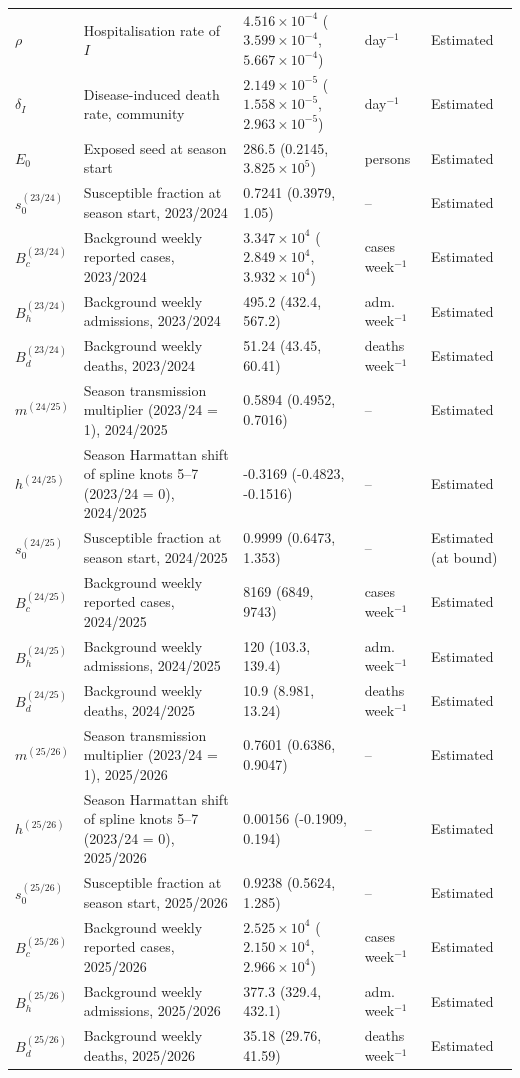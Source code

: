 \begin{longtable}{llll l}
$\rho$ & Hospitalisation rate of $I$ & $4.516\times10^{-4}$ ($3.599\times10^{-4}$, $5.667\times10^{-4}$) & day$^{-1}$ & Estimated\\
$\delta_I$ & Disease-induced death rate, community & $2.149\times10^{-5}$ ($1.558\times10^{-5}$, $2.963\times10^{-5}$) & day$^{-1}$ & Estimated\\
$E_0$ & Exposed seed at season start & 286.5 (0.2145, $3.825\times10^{5}$) & persons & Estimated\\
$s_0^{(23/24)}$ & Susceptible fraction at season start, 2023/2024 & 0.7241 (0.3979, 1.05) & -- & Estimated\\
$B_c^{(23/24)}$ & Background weekly reported cases, 2023/2024 & $3.347\times10^{4}$ ($2.849\times10^{4}$, $3.932\times10^{4}$) & cases week$^{-1}$ & Estimated\\
$B_h^{(23/24)}$ & Background weekly admissions, 2023/2024 & 495.2 (432.4, 567.2) & adm. week$^{-1}$ & Estimated\\
$B_d^{(23/24)}$ & Background weekly deaths, 2023/2024 & 51.24 (43.45, 60.41) & deaths week$^{-1}$ & Estimated\\
$m^{(24/25)}$ & Season transmission multiplier (2023/24 = 1), 2024/2025 & 0.5894 (0.4952, 0.7016) & -- & Estimated\\
$h^{(24/25)}$ & Season Harmattan shift of spline knots 5--7 (2023/24 = 0), 2024/2025 & -0.3169 (-0.4823, -0.1516) & -- & Estimated\\
$s_0^{(24/25)}$ & Susceptible fraction at season start, 2024/2025 & 0.9999 (0.6473, 1.353) & -- & Estimated (at bound)\\
$B_c^{(24/25)}$ & Background weekly reported cases, 2024/2025 & 8169 (6849, 9743) & cases week$^{-1}$ & Estimated\\
$B_h^{(24/25)}$ & Background weekly admissions, 2024/2025 & 120 (103.3, 139.4) & adm. week$^{-1}$ & Estimated\\
$B_d^{(24/25)}$ & Background weekly deaths, 2024/2025 & 10.9 (8.981, 13.24) & deaths week$^{-1}$ & Estimated\\
$m^{(25/26)}$ & Season transmission multiplier (2023/24 = 1), 2025/2026 & 0.7601 (0.6386, 0.9047) & -- & Estimated\\
$h^{(25/26)}$ & Season Harmattan shift of spline knots 5--7 (2023/24 = 0), 2025/2026 & 0.00156 (-0.1909, 0.194) & -- & Estimated\\
$s_0^{(25/26)}$ & Susceptible fraction at season start, 2025/2026 & 0.9238 (0.5624, 1.285) & -- & Estimated\\
$B_c^{(25/26)}$ & Background weekly reported cases, 2025/2026 & $2.525\times10^{4}$ ($2.150\times10^{4}$, $2.966\times10^{4}$) & cases week$^{-1}$ & Estimated\\
$B_h^{(25/26)}$ & Background weekly admissions, 2025/2026 & 377.3 (329.4, 432.1) & adm. week$^{-1}$ & Estimated\\
$B_d^{(25/26)}$ & Background weekly deaths, 2025/2026 & 35.18 (29.76, 41.59) & deaths week$^{-1}$ & Estimated\\
\hline
\end{longtable}